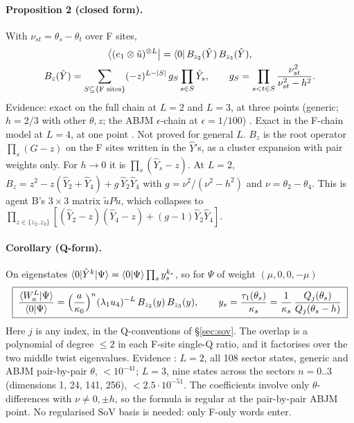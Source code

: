 \paragraph{Proposition 2 (closed form).} With $\nu_{st}=\theta_s-\theta_t$ over F sites,
\begin{gather}\label{eq:qform-Bz}
 \big\langle(e_1\otimes\tilde u)^{\otimes L}\big|=\langle0|\,B_{z_2}(\hat Y)\,B_{z_3}(\hat Y),\\
 B_z(\hat Y)=\sum_{S\subseteq\{\text{F sites}\}}(-z)^{L-|S|}\,g_S\prod_{s\in S}\hat Y_s,\qquad
 g_S=\prod_{s<t\in S}\frac{\nu_{st}^2}{\nu_{st}^2-h^2}.\nonumber
\end{gather}
Evidence: exact on the full chain at $L=2$ and $L=3$, at three points (generic; $h=2/3$ with other $\theta,z$; the ABJM
$\epsilon$-chain at $\epsilon=1/100$) \ex. Exact in the F-chain model at $L=4$, at one point \npy. Not proved for general $L$.
$B_z$ is the root operator $\prod_s(G-z)$ on the F sites written in the $\hat Y$'s, as a cluster expansion with pair weights
only. For $h\to0$ it is $\prod_s(\hat Y_s-z)$. At $L=2$, $B_z=z^2-z(\hat Y_2+\hat Y_4)+g\,\hat Y_2\hat Y_4$ with
$g=\nu^2/(\nu^2-h^2)$ and $\nu=\theta_2-\theta_4$. This is agent B's $3\times3$ matrix $\tilde uP\tilde u$, which collapses to
$\prod_{z\in\{z_2,z_3\}}[(\hat Y_2-z)(\hat Y_4-z)+(g-1)\hat Y_2\hat Y_4]$.

\paragraph{Corollary (Q-form).} On eigenstates $\langle0|\hat Y^k|\Psi\rangle=\langle0|\Psi\rangle\prod_s y_s^{k_s}$, so for $\Psi$ of weight
$(\mu,0,0,-\mu)$
\begin{equation}\label{eq:qform-main}
 \boxed{\;\frac{\langle W_a^L|\Psi\rangle}{\langle0|\Psi\rangle}=\Big(\frac a{\kappa_0}\Big)^n(\lambda_1u_4)^{-L}\,B_{z_2}(y)\,B_{z_3}(y),\qquad
 y_s=\frac{\tau_1(\theta_s)}{\kappa_s}=\frac1{\kappa_s}\,\frac{Q_j(\theta_s)}{Q_j(\theta_s-h)}\;}
\end{equation}
Here $j$ is any index, in the Q-conventions of \S\ref{sec:sov}. The overlap is a polynomial of degree $\le2$ in each F-site
single-Q ratio, and it factorises over the two middle twist eigenvalues. Evidence \hp: $L=2$, all 108 sector states, generic
and ABJM pair-by-pair $\theta$, $<10^{-41}$; $L=3$, nine states across the sectors $n=0..3$ (dimensions 1, 24, 141, 256),
$<2.5\cdot10^{-51}$. The coefficients involve only $\theta$-differences with $\nu\ne0,\pm h$, so the formula is regular at the
pair-by-pair ABJM point. No regularised SoV basis is needed: only F-only words enter.

